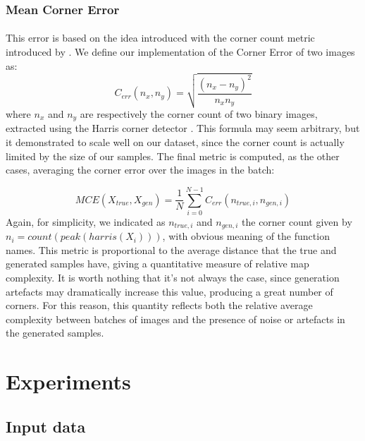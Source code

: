 \subsubsection{Mean Corner Error}
\paragraph{} This error is based on the idea introduced with the corner count metric introduced by \cite{slam}. We define our implementation of the Corner Error of two images as:
\begin{equation}
C_{err}(n_{x}, n_{y}) = \sqrt{\frac{(n_{x} - n_{y})^2}{n_{x}n_{y}}}
\end{equation}
where $n_{x}$ and $n_{y}$ are respectively the corner count of two binary images, extracted using the Harris corner detector \cite{harrisdetector}.
This formula may seem arbitrary, but it demonstrated to scale well on our dataset, since the corner count is actually limited by the size of our samples. The final metric is computed, as the other cases, averaging the corner error over the images in the batch:

\begin{equation}
MCE(X_{true}, X_{gen}) = \frac{1}{N} \sum_{i=0}^{N-1} C_{err}(n_{true,i}, n_{gen,i})
\end{equation}
Again, for simplicity, we indicated as $ n_{true,i} $ and $ n_{gen,i} $ the corner count given by \\ $ n_{i} = count(peak(harris(X_{i}))) $, with obvious meaning of the function names.
This metric is proportional to the average distance that the true and generated samples have, giving a quantitative measure of relative map complexity. It is worth nothing that it's not always the case, since generation artefacts may dramatically increase this value, producing a great number of corners. For this reason, this quantity reflects both the relative average complexity between batches of images and the presence of noise or artefacts in the generated samples.


\section{Experiments}
\label{sec:experiments}

\subsection{Input data}
\label{sec:InputSelection}

